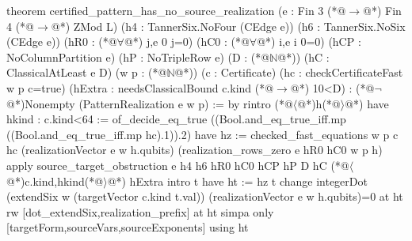 theorem certified_pattern_has_no_source_realization
    (e : Fin 3 (*@$\to$@*) Fin 4 (*@$\to$@*) ZMod L)
    (h4 : TannerSix.NoFour (CEdge e)) (h6 : TannerSix.NoSix (CEdge e))
    (hR0 : (*@$\forall$@*) j,e 0 j=0) (hC0 : (*@$\forall$@*) i,e i 0=0)
    (hCP : NoColumnPartition e) (hP : NoTripleRow e)
    (D : (*@$\mathbb N$@*)) (hC : ClassicalAtLeast e D) (w p : (*@$\mathbb N$@*)) (c : Certificate)
    (hc : checkCertificateFast w p c=true)
    (hExtra : needsClassicalBound c.kind (*@$\to$@*) 10<D) : (*@$\neg$@*)Nonempty (PatternRealization e w p) := by
  rintro (*@$\langle$@*)h(*@$\rangle$@*)
  have hkind : c.kind<64 := of_decide_eq_true
    ((Bool.and_eq_true_iff.mp ((Bool.and_eq_true_iff.mp hc).1)).2)
  have hz := checked_fast_equations w p c hc (realizationVector e w h.qubits)
    (realization_rows_zero e hR0 hC0 w p h)
  apply source_target_obstruction e h4 h6 hR0 hC0 hCP hP D hC (*@$\langle$@*)c.kind,hkind(*@$\rangle$@*) hExtra
  intro t
  have ht := hz t
  change integerDot (extendSix w (targetVector c.kind t.val)) (realizationVector e w h.qubits)=0 at ht
  rw [dot_extendSix,realization_prefix] at ht
  simpa only [targetForm,sourceVars,sourceExponents] using ht

